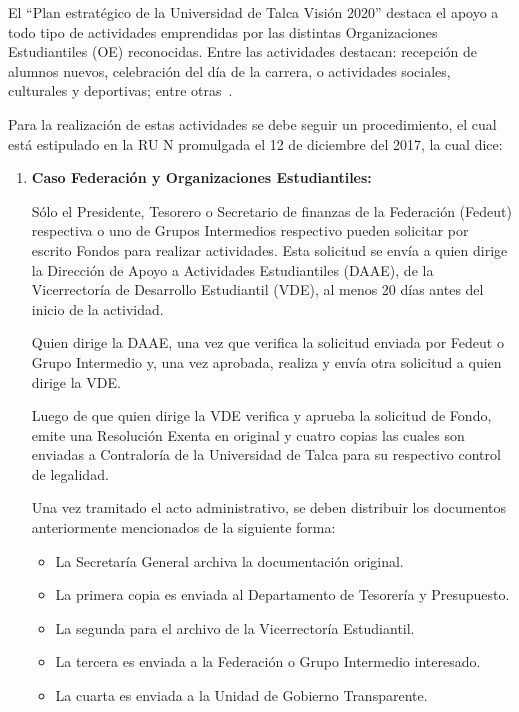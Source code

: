 El ``Plan estratégico de la Universidad de Talca Visión 2020'' destaca el apoyo a todo tipo de actividades emprendidas por las distintas Organizaciones Estudiantiles (OE) reconocidas. Entre las actividades destacan: recepción de alumnos nuevos, celebración del día de la carrera, o actividades sociales, culturales y deportivas; entre otras~\cite{5}.

Para la realización de estas actividades se debe seguir un procedimiento, el cual está estipulado en la RU N promulgada el 12 de diciembre del 2017, la cual dice:

\begin{enumerate}[label=\textbf{\Alph*.}]
    \item \textbf{Caso Federación y Organizaciones Estudiantiles:}

    Sólo el Presidente, Tesorero o Secretario de finanzas de la Federación (Fedeut) respectiva o uno de Grupos Intermedios respectivo pueden solicitar por escrito Fondos para realizar actividades. Esta solicitud se envía a quien dirige la Dirección de Apoyo a Actividades Estudiantiles (DAAE), de la Vicerrectoría de Desarrollo Estudiantil (VDE), al menos 20 días antes del inicio de la actividad. 

    Quien dirige la DAAE, una vez que verifica la solicitud enviada por Fedeut o Grupo Intermedio y, una vez aprobada, realiza y envía otra solicitud a quien dirige la VDE.

    Luego de que quien dirige la VDE verifica y aprueba la solicitud de Fondo, emite una Resolución Exenta en original y cuatro copias las cuales son enviadas a Contraloría de la Universidad de Talca para su respectivo control de legalidad. 
    
    Una vez tramitado el acto administrativo, se deben distribuir los documentos anteriormente mencionados de la siguiente forma: 

    \begin{itemize}
        \item La Secretaría General archiva la documentación original.
        \item La primera copia es enviada al Departamento de Tesorería y Presupuesto.
        \item La segunda para el archivo de la Vicerrectoría Estudiantil.
        \item La tercera es enviada a la Federación o Grupo Intermedio interesado.
        \item La cuarta es enviada a la Unidad de Gobierno Transparente.
    \end{itemize}


\end{enumerate}
